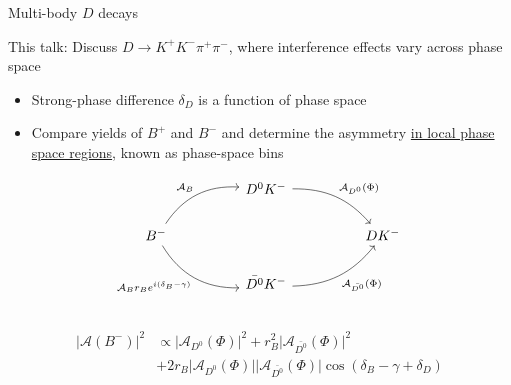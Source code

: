 \documentclass[xcolor={dvipsnames}]{beamer}
\begin{document}
\begin{frame}[fragile]{Multi-body $D$ decays}
  \begin{center}
    This talk: Discuss $D\to K^+K^-\pi^+\pi^-$, where interference effects vary across phase space
  \end{center}
  \vspace{-0.3cm}
  \begin{itemize}
    \setlength\itemsep{0.5em}
    \item{Strong-phase difference $\delta_D$ is a function of phase space}
    \item{Compare yields of $B^+$ and $B^-$ and determine the asymmetry \underline{in local phase space regions}, known as phase-space bins}
  \end{itemize}
  \begin{equation*}
    \begin{tikzcd}[column sep=huge]
      & D^0K^- \arrow[dr, bend left = 25, "\mathcal{A}_{D^0}(\Phi)"] & \\
      B^- \arrow[ur, bend left, "\mathcal{A}_B"] \arrow[dr, bend right, "\mathcal{A}_B r_B e^{i(\delta_B - \gamma)}"'] & [5cm] & DK^- \\
      & \bar{D^0}K^- \arrow[ur, bend right = 25, "\mathcal{A}_{\bar{D^0}}(\Phi)"'] & \\
    \end{tikzcd}
  \end{equation*}
  \vspace{-0.9cm}
  \begin{align*}
    \lvert\mathcal{A}(B^-)\lvert^2&\propto\lvert\mathcal{A}_{D^0}(\Phi)\lvert^2 + r_B^2\lvert\mathcal{A}_{\bar{D^0}}(\Phi)\lvert^2 \\
    &+ 2r_B\lvert\mathcal{A}_{D^0}(\Phi)\lvert\lvert\mathcal{A}_{\bar{D^0}}(\Phi)\lvert\cos(\delta_B - \gamma + \delta_D)
  \end{align*}
\end{frame}
\end{document}
